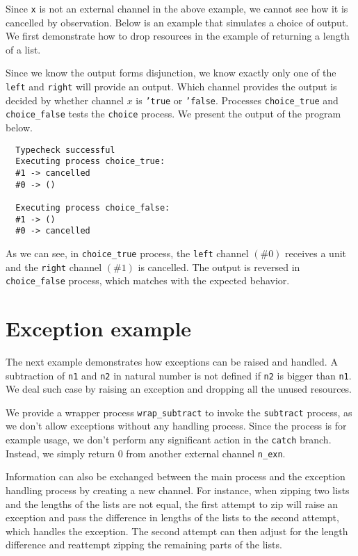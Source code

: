 \documentclass[12pt, openany]{memoir}
\begin{document}
Since \texttt{x} is not an external channel in the above example, we cannot see how it is cancelled by observation.
Below is an example that simulates a choice of output. 
We first demonstrate how to drop resources in the example of returning a length of a list.

Since we know the output forms disjunction, we know exactly only one of the \texttt{left} and \texttt{right}
will provide an output. 
Which channel provides the output is decided by whether channel $x$ is \texttt{'true} or \texttt{'false}.
Processes \texttt{choice\_true} and \texttt{choice\_false} tests the \texttt{choice} process.
We present the output of the program below.
\begin{verbatim}
  Typecheck successful                  
  Executing process choice_true:
  #1 -> cancelled
  #0 -> ()

  Executing process choice_false:
  #1 -> ()
  #0 -> cancelled
\end{verbatim}
As we can see, in \texttt{choice\_true} process, the \texttt{left} channel $(\# 0)$ receives a unit and the \texttt{right} channel $(\# 1)$ is cancelled.
The output is reversed in \texttt{choice\_false} process, which matches with the expected behavior.
\section{Exception example}
The next example demonstrates how exceptions can be raised and handled. 
A subtraction of \texttt{n1} and \texttt{n2} in natural number is not defined if 
\texttt{n2} is bigger than \texttt{n1}. We deal such case by raising an exception and dropping all the unused resources.

We provide a wrapper process \texttt{wrap\_subtract} to invoke the \texttt{subtract} process, 
as we don't allow exceptions without any handling process. 
Since the process is for example usage, we don't perform any significant action in the \texttt{catch} branch. 
Instead, we simply return $0$ from another external channel \texttt{n\_exn}.

Information can also be exchanged between the main process and the exception handling process by creating a new channel. 
For instance, when zipping two lists and the lengths of the lists are not equal, 
the first attempt to zip will raise an exception and pass the difference in lengths of the lists to the second attempt, 
which handles the exception. The second attempt can then adjust for the length difference and reattempt zipping the remaining parts of the lists.
\end{document}
